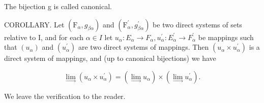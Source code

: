 The bijection g is called canonical.

COROLLARY. Let \((\mathrm{F}_{\alpha}, g_{\beta\alpha})\) and \((\mathrm{F}_{\alpha}^{\prime}, g_{\beta\alpha}^{\prime})\) be two direct systems of sets relative to I, and for each \(\alpha \in I\) let \(u_{\alpha}: E_{\alpha} \to F_{\alpha}, u_{\alpha}^{\prime}: E_{\alpha}^{\prime} \to F_{\alpha}^{\prime}\) be mappings such that \((u_{\alpha})\) and \((u_{\alpha}^{\prime})\) are two direct systems of mappings. Then \((u_{\alpha} \times u_{\alpha}^{\prime})\) is a direct system of mappings, and (up to canonical bijections) we have

\[
\lim _ {\rightarrow} \left(u _ {\alpha} \times u _ {\alpha} ^ {\prime}\right) = (\lim _ {\rightarrow} u _ {\alpha}) \times (\lim _ {\rightarrow} u _ {\alpha} ^ {\prime}).\tag{35}
\]

We leave the verification to the reader.

